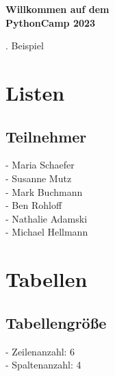 \documentclass[a4paper]{article}
\title{}
\author{}
\date{2023-06-24}
\newcommand{\name}{PythonCamp 2023}
\newcommand{\BeispielCommand}{4. Beispiel}
\begin{document}
	
	
	\begin{figure}
		\vspace*{\dimexpr+1cm-\topmargin-\headsep-\headheight-\baselineskip}%
		\hspace*{\dimexpr-1cm-\evensidemargin-\parindent}%
	\end{figure}
	\vspace*{-1cm}
	
	\bigskip
	
	{\centering \bfseries \huge Willkommen auf dem \\ \name \par}

	\bigskip
	{\centering \BeispielCommand \par}

	\bigskip
	\section{Listen}
	
	\subsection{Teilnehmer}
		 - Maria Schaefer \\
  		 - Susanne Mutz \\
  		 - Mark Buchmann \\
  		 - Ben Rohloff \\
  		 - Nathalie Adamski \\
  		 - Michael Hellmann \\
  	
	\section{Tabellen}

	\subsection{Tabellengröße}

	- Zeilenanzahl: 6 \\
	- Spaltenanzahl: 4 \\
\end{document}
